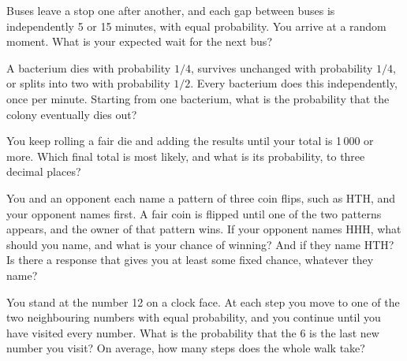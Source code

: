 \begin{question}\label{iq:iv1:waiting-times-and-markov-chains:12}
Buses leave a stop one after another, and each gap between buses is independently 5 or 15 minutes, with equal probability. You arrive at a random moment. What is your expected wait for the next bus?
\end{question}

\begin{question}\label{iq:iv1:waiting-times-and-markov-chains:13}
A bacterium dies with probability $1/4$, survives unchanged with probability $1/4$, or splits into two with probability $1/2$. Every bacterium does this independently, once per minute. Starting from one bacterium, what is the probability that the colony eventually dies out?
\end{question}

\begin{question}\label{iq:iv1:waiting-times-and-markov-chains:14}
You keep rolling a fair die and adding the results until your total is 1\,000 or more. Which final total is most likely, and what is its probability, to three decimal places?
\end{question}

\begin{question}\label{iq:iv1:waiting-times-and-markov-chains:15}
You and an opponent each name a pattern of three coin flips, such as HTH, and your opponent names first. A fair coin is flipped until one of the two patterns appears, and the owner of that pattern wins. If your opponent names HHH, what should you name, and what is your chance of winning? And if they name HTH? Is there a response that gives you at least some fixed chance, whatever they name?
\end{question}

\begin{question}\label{iq:iv1:waiting-times-and-markov-chains:16}
You stand at the number 12 on a clock face. At each step you move to one of the two neighbouring numbers with equal probability, and you continue until you have visited every number. What is the probability that the 6 is the last new number you visit? On average, how many steps does the whole walk take?
\end{question}

